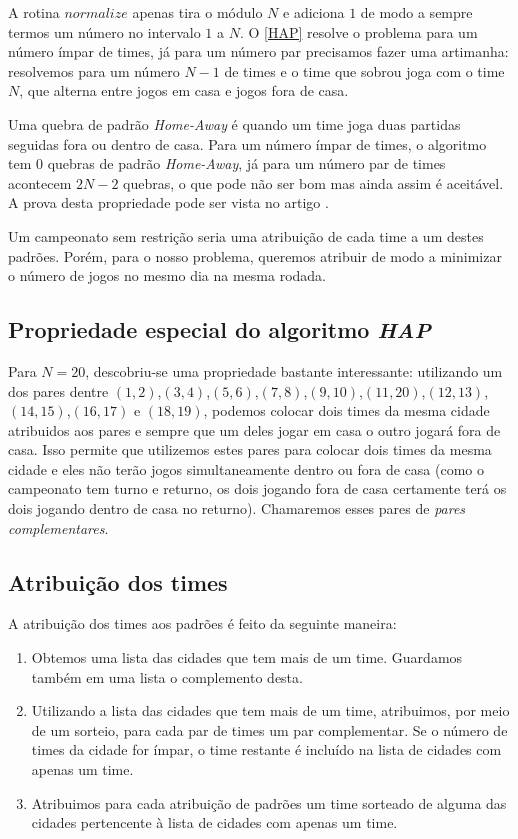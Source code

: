 \documentclass[a4paper,12pt,titlepage]{article}
\begin{document}
A rotina $normalize$ apenas tira o módulo $N$ e adiciona $1$ de modo a sempre termos um número no intervalo $1$ a $N$. 
O \ref{HAP} resolve o problema para um número ímpar de times, já para um número par precisamos fazer uma artimanha:
resolvemos para um número $N-1$ de times e o time que sobrou joga com o time $N$, que alterna entre jogos em casa e 
jogos fora de casa. 

Uma quebra de padrão \textit{Home-Away} é quando um time joga duas partidas seguidas fora ou dentro de casa. Para
um número ímpar de times, o algoritmo tem $0$ quebras de padrão \textit{Home-Away}, já para um número par de times
acontecem $2N-2$ quebras, o que pode não ser bom mas ainda assim é aceitável. A prova desta propriedade
pode ser vista no artigo \cite{90Schreuder}.

Um campeonato sem restrição seria uma atribuição de cada time a um destes padrões. Porém, para o nosso problema, queremos atribuir 
de modo a minimizar o número de jogos no mesmo dia na mesma rodada. 

\subsection{Propriedade especial do algoritmo \textit{HAP}}

Para $N = 20$, descobriu-se uma propriedade bastante interessante: utilizando um dos pares dentre 
$(1,2)$,$(3,4)$,$(5,6)$,$(7,8)$,$(9,10)$,$(11,20)$,$(12,13)$,$(14,15)$,$(16,17)$ e $(18,19)$, podemos colocar dois times da mesma
cidade atribuidos aos pares e sempre que um deles jogar em casa o outro jogará fora de casa. 
Isso permite que utilizemos estes pares para colocar dois times da mesma cidade e eles não terão jogos simultaneamente
dentro ou fora de casa (como o campeonato tem turno e returno, os dois jogando fora de casa certamente terá os dois
jogando dentro de casa no returno). Chamaremos esses pares de \textit{pares complementares}.



\subsection{Atribuição dos times}

A atribuição dos times aos padrões é feito da seguinte maneira:

\begin{enumerate}
	\item Obtemos uma lista das cidades que tem mais de um time. Guardamos também em uma lista o complemento desta.
	\item Utilizando a lista das cidades que tem mais de um time, atribuimos, por meio de um sorteio, para cada par de times um par complementar.  
Se o número de times da cidade for ímpar, o time restante é incluído na lista de cidades com apenas um time.
	\item Atribuimos para cada atribuição de padrões um time sorteado de alguma das cidades pertencente à lista de cidades com apenas um time.
\end{enumerate}
\end{document}
